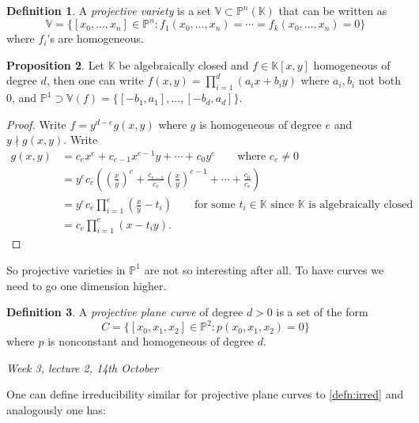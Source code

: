 \documentclass{article}
\newcommand{\K}{\mathbb{K}}
\newcommand{\V}{\mathbb{V}}
\newcommand{\p}{\mathbb{P}}
\theoremstyle{definition}
\newtheorem{defn}{Definition}[subsection]
\newtheorem{prop}[defn]{Proposition}
\begin{document}
\begin{defn}
A \textit{projective variety} is a set $\V\subset\p^n(\K)$ that can be written as
\[
\V=\{[x_0,\ldots,x_n]\in\p^n:f_1(x_0,\ldots,x_n)=\cdots=f_k(x_0,\ldots,x_n)=0\}
\]
where $f_i$'s are homogeneous.
\end{defn}

\begin{prop}
Let $\K$ be algebraically closed and $f\in\K[x,y]$ homogeneous of degree $d$, then one can write $f(x,y)=\prod_{i=1}^d (a_ix+b_iy)$ where $a_i,b_i$ not both 0, and $\p^1\supset\V(f)=\{[-b_1,a_1],\ldots,[-b_d,a_d]\}$.
\end{prop}
\begin{proof}
Write $f=y^{d-e}g(x,y)$ where $g$ is homogeneous of degree $e$ and $y\nmid g(x,y)$. Write
\[
\begin{aligned}
g(x,y)&=c_ex^e+c_{e-1}x^{e-1}y+\cdots+c_0y^e\qquad\text{where }c_e\neq 0 \\
&=y^e c_e\left(\left(\frac{x}{y}\right)^e+\frac{c_{e-1}}{c_e}\left(\frac{x}{y}\right)^{e-1}+\cdots+\frac{c_0}{c_e}\right)\\
&=y^e c_e \prod_{i=1}^e\left(\frac{x}{y}-t_i\right) \qquad\text{for some }t_i\in\K\text{ since }\K\text{ is algebraically closed} \\
&=c_e\prod_{i=1}^e(x-t_iy).
\end{aligned}
\]
\end{proof}

So projective varieties in $\p^1$ are not so interesting after all. To have curves we need to go one dimension higher.

\begin{defn}
A \textit{projective plane curve} of degree $d>0$ is a set of the form
\[
C=\{[x_0,x_1,x_2]\in\p^2:p(x_0,x_1,x_2)=0\}
\]
where $p$ is nonconstant and homogeneous of degree $d$.
\end{defn}

\begin{flushright}
\textit{Week 3, lecture 2, 14th October}
\end{flushright}

One can define irreducibility similar for projective plane curves to \ref{defn:irred} and analogously one has:
\end{document}
